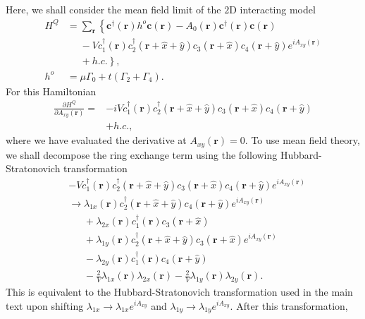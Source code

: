 \documentclass[prb,aps,twocolumn,groupaddress,floatfix]{revtex4-1}
\begin{document}
Here, we shall consider the mean field limit of the $2$D interacting model 
\begin{equation}
\begin{split}
H^{Q} &= \sum_{\bm{r}} \left\{\bm{c}^\dagger(\bm{r}) h^o \bm{c}(\bm{r}) - A_0(\bm{r}) \bm{c}^\dagger(\bm{r}) \bm{c}(\bm{r})\right.\\&\phantom{=} - V c_1^\dagger(\bm{r})c^\dagger_2(\bm{r}+\hat{x}+\hat{y})c_3(\bm{r}+\hat{x})c_4(\bm{r}+\hat{y})e^{i A_{xy}(\bm{r})} \\&\phantom{=}+\left. h.c.\right\},\\
h^o &= \mu \Gamma_0 +t (\Gamma_2+\Gamma_4).
\end{split}\label{Aeq:LatticeHam2}
\end{equation}
For this Hamiltonian 
\begin{equation}
\begin{split}
\frac{\partial H^Q}{\partial{A_{xy}(\bm{r})}} =& - i V c_1^\dagger(\bm{r})c^\dagger_2(\bm{r}+\hat{x}+\hat{y})c_3(\bm{r}+\hat{x})c_4(\bm{r}+\hat{y}) \\&+ h.c.,
\end{split}
\end{equation}
where we have evaluated the derivative at $A_{xy}(\bm{r}) = 0$. To use mean field theory, we shall decompose the ring exchange term using the following Hubbard-Stratonovich transformation
\begin{equation}
\begin{split}
&-V c_1^\dagger(\bm{r})c_2^\dagger(\bm{r}+\hat{x}+\hat{y})c_3(\bm{r}+\hat{x})c_4(\bm{r}+\hat{y})e^{iA_{xy}(\bm{r})} \\ &\rightarrow \lambda_{1x}(\bm{r})c_2^\dagger(\bm{r}+\hat{x}+\hat{y})c_4(\bm{r}+\hat{y})e^{iA_{xy}(\bm{r})}\\&\phantom{\rightarrow} + \lambda_{2x}(\bm{r}) c_1^\dagger(\bm{r})c_3(\bm{r}+\hat{x}) \\&\phantom{\rightarrow}+\lambda_{1y}(\bm{r})c_2^\dagger(\bm{r}+\hat{x}+\hat{y})c_3(\bm{r}+\hat{x})e^{iA_{xy}(\bm{r})}\\&\phantom{\rightarrow}- \lambda_{2y}(\bm{r})c_1^\dagger(\bm{r})c_4(\bm{r}+\hat{y})\\ &\phantom{\rightarrow}- \frac{2}{V}\lambda_{1x}(\bm{r})\lambda_{2x}(\bm{r}) - \frac{2}{V}\lambda_{1y}(\bm{r})\lambda_{2y}(\bm{r}). 
\end{split}\label{Aeq:LatticeHS}
\end{equation}
This is equivalent to the Hubbard-Stratonovich transformation used in the main text upon shifting $\lambda_{1x} \rightarrow \lambda_{1x} e^{iA_{xy}}$ and $\lambda_{1y} \rightarrow \lambda_{1y} e^{iA_{xy}}$. After this transformation, 
\end{document}
